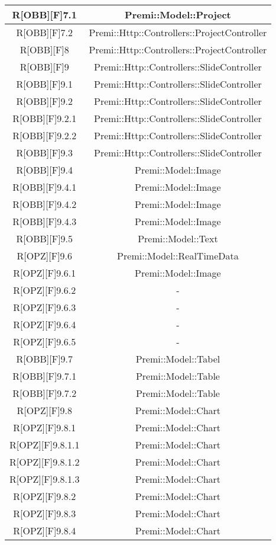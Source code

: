 \begin{table}[h]
	\begin{center}
		\begin{tabular}{|c|c|}
			\toprule
			R[OBB][F]7.1 & Premi::Model::Project\\
		\midrule
			R[OBB][F]7.2 & Premi::Http::Controllers::ProjectController\\
		\midrule
			R[OBB][F]8 & Premi::Http::Controllers::ProjectController\\
		\midrule
			R[OBB][F]9 & Premi::Http::Controllers::SlideController\\
		\midrule
			R[OBB][F]9.1 & Premi::Http::Controllers::SlideController\\
		\midrule
			R[OBB][F]9.2 & Premi::Http::Controllers::SlideController\\
		\midrule
			R[OBB][F]9.2.1 & Premi::Http::Controllers::SlideController\\
		\midrule
			R[OBB][F]9.2.2 & Premi::Http::Controllers::SlideController\\
		\midrule
			R[OBB][F]9.3 & Premi::Http::Controllers::SlideController\\
		\midrule
			R[OBB][F]9.4 & Premi::Model::Image\\
		\midrule
			R[OBB][F]9.4.1 & Premi::Model::Image\\
		\midrule
			R[OBB][F]9.4.2 & Premi::Model::Image\\
		\midrule
			R[OBB][F]9.4.3 & Premi::Model::Image\\
		\midrule
			R[OBB][F]9.5 & Premi::Model::Text\\
		\midrule
			R[OPZ][F]9.6 & Premi::Model::RealTimeData\\
		\midrule
			R[OPZ][F]9.6.1 & Premi::Model::Image\\
		\midrule
			R[OPZ][F]9.6.2 & -\\
		\midrule
			R[OPZ][F]9.6.3 & -\\
		\midrule
			R[OPZ][F]9.6.4 & -\\
		\midrule
			R[OPZ][F]9.6.5 & -\\
		\midrule
			R[OBB][F]9.7 & Premi::Model::Tabel\\
		\midrule
			R[OBB][F]9.7.1 & Premi::Model::Table\\
		\midrule
			R[OBB][F]9.7.2 & Premi::Model::Table\\
		\midrule
			R[OPZ][F]9.8 & Premi::Model::Chart\\
		\midrule
			R[OPZ][F]9.8.1 & Premi::Model::Chart\\
		\midrule
			R[OPZ][F]9.8.1.1 & Premi::Model::Chart\\
		\midrule
			R[OPZ][F]9.8.1.2 & Premi::Model::Chart\\
		\midrule
			R[OPZ][F]9.8.1.3 & Premi::Model::Chart\\
		\midrule
			R[OPZ][F]9.8.2 & Premi::Model::Chart\\
		\midrule
			R[OPZ][F]9.8.3 & Premi::Model::Chart\\
		\midrule
			R[OPZ][F]9.8.4 & Premi::Model::Chart\\
		\bottomrule
		\end{tabular}
	\end{center}
\end{table}

